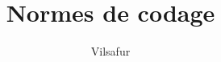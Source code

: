 \documentclass[french]{VGReport}
\title{Normes de codage}
\author{
    Vilsafur
}
\begin{document}
\maketitle

\MyToc

\sloppy


\newpage

\newpage


\newpage


%

%
\end{document}
